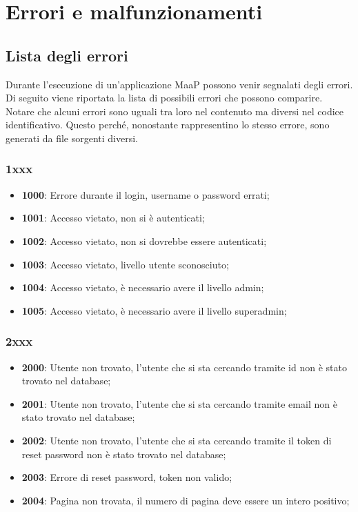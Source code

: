 \section{Errori e malfunzionamenti}

\subsection{Lista degli errori}

Durante l'esecuzione di un'applicazione MaaP possono venir segnalati degli errori. Di seguito viene riportata la lista di possibili errori che possono comparire. Notare che alcuni errori sono uguali tra loro nel contenuto ma diversi nel codice identificativo. Questo perché, nonostante rappresentino lo stesso errore, sono generati da file sorgenti diversi.

\subsubsection{1xxx}

\begin{itemize}

	\item \textbf{1000}: Errore durante il login, username o password errati;
	\item \textbf{1001}: Accesso vietato, non si è autenticati;
	\item \textbf{1002}: Accesso vietato, non si dovrebbe essere autenticati;
	\item \textbf{1003}: Accesso vietato, livello utente sconosciuto;
	\item \textbf{1004}: Accesso vietato, è necessario avere il livello admin;
	\item \textbf{1005}: Accesso vietato, è necessario avere il livello superadmin;

\end{itemize}

\subsubsection{2xxx}

\begin{itemize}

	\item \textbf{2000}: Utente non trovato, l'utente che si sta cercando tramite id non è stato trovato nel database;
	\item \textbf{2001}: Utente non trovato, l'utente che si sta cercando tramite email non è stato trovato nel database;
	\item \textbf{2002}: Utente non trovato, l'utente che si sta cercando tramite il token di reset password non è stato trovato nel database;
	\item \textbf{2003}: Errore di reset password, token non valido;
	\item \textbf{2004}: Pagina non trovata, il numero di pagina deve essere un intero positivo;

\end{itemize}


